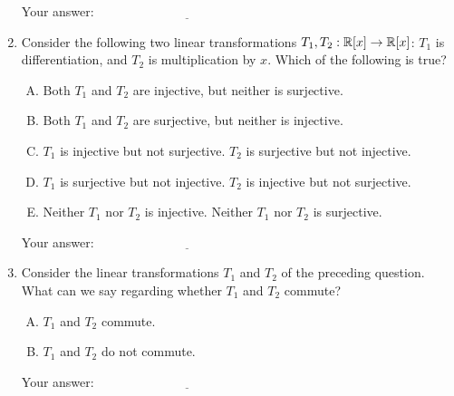 \documentclass[10pt]{amsart}
\begin{document}
\begin{enumerate}
  \vspace{0.1in}
  Your answer: $\underline{\qquad\qquad\qquad\qquad\qquad\qquad\qquad}$
  \vspace{0.1in}

\item Consider the following two linear transformations $T_1,T_2:\mathbb{R}[x]
  \to \mathbb{R}[x]$: $T_1$ is differentiation, and $T_2$ is multiplication by
  $x$. Which of the following is true?

  \begin{enumerate}[(A)]
  \item Both $T_1$ and $T_2$ are injective, but neither is surjective.
  \item Both $T_1$ and $T_2$ are surjective, but neither is injective.
  \item $T_1$ is injective but not surjective. $T_2$ is surjective but not injective.
  \item $T_1$ is surjective but not injective. $T_2$ is injective but
    not surjective.
  \item Neither $T_1$ nor $T_2$ is injective. Neither $T_1$ nor $T_2$
    is surjective.
  \end{enumerate}

  \vspace{0.1in}
  Your answer: $\underline{\qquad\qquad\qquad\qquad\qquad\qquad\qquad}$
  \vspace{0.1in}

\item Consider the linear transformations $T_1$ and $T_2$ of the
  preceding question. What can we say regarding whether $T_1$ and
  $T_2$ commute?

  \begin{enumerate}[(A)]
  \item $T_1$ and $T_2$ commute.
  \item $T_1$ and $T_2$ do not commute.
  \end{enumerate}

  \vspace{0.1in}
  Your answer: $\underline{\qquad\qquad\qquad\qquad\qquad\qquad\qquad}$
  \vspace{0.1in}
\end{enumerate}
\end{document}
